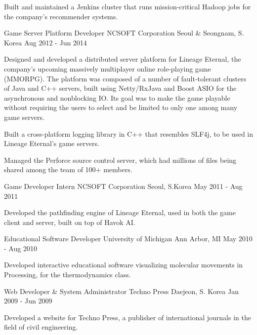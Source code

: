 \documentclass[12pt, a4paper]{awesome-cv}
\begin{document}
\begin{cventries}
{\begin{cvitems}
				\item Built and maintained a Jenkins cluster that runs mission-critical Hadoop jobs for the company's recommender systems.
			\end{cvitems}
		}
		\cventry
		{Game Server Platform Developer}
		{NCSOFT Corporation}
		{Seoul \& Seongnam, S. Korea}
		{Aug 2012 - Jun 2014}
		{
			\begin{cvitems}
				\item Designed and developed a distributed server platform for Lineage Eternal, the company's upcoming massively multiplayer online role-playing game (MMORPG).
				The platform was composed of a number of fault-tolerant clusters of Java and C++ servers, built using Netty/RxJava and Boost ASIO for the asynchronous and nonblocking IO.
				Its goal was to make the game playable without requiring the users to select and be limited to only one among many game servers.
				\item Built a cross-platform logging library in C++ that resembles SLF4j, to be used in Lineage Eternal's game servers.
				\item Managed the Perforce source control server, which had millions of files being shared among the team of 100+ members.
			\end{cvitems}
		}
		\cventry
		{Game Developer Intern}
		{NCSOFT Corporation}
		{Seoul, S.Korea}
		{May 2011 - Aug 2011}
		{
			\begin{cvitems}
				\item Developed the pathfinding engine of Lineage Eternal, used in both the game client and server, built on top of Havok AI.
			\end{cvitems} 
		}
		\cventry
		{Educational Software Developer}
		{University of Michigan}
		{Ann Arbor, MI}
		{May 2010 - Aug 2010}
		{
			\begin{cvitems}
				\item Developed interactive educational software visualizing molecular movements in Processing, for the thermodynamics class.
			\end{cvitems} 
		}
		\cventry
		{Web Developer \& System Administrator}
		{Techno Press}
		{Daejeon, S. Korea}
		{Jan 2009 - Jun 2009}
		{
			\begin{cvitems}
				\item Developed a website for Techno Press, a publisher of international journals in the field of civil engineering.
			\end{cvitems} 
		}
	\end{cventries}
	
\end{document}

